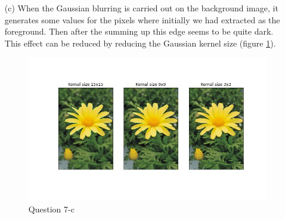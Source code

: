 \documentclass[11pt]{article}
\begin{document}
\begin{itemize}
    \item[(c)] When the Gaussian blurring is carried out on the background image, it generates some values for the pixels where initially we had
    extracted as the foreground. Then after the summing up this edge seems to be quite dark. This effect can be reduced by reducing the Gaussian 
    kernel size (figure \ref{73}).

    \begin{figure}[!h]
        \centering
        \includegraphics[width=\textwidth]{Images/73.jpg}
        \caption{Question 7-c}
        \label{73}
    \end{figure}
     
\end{itemize} 
    
\newpage


\end{document}
